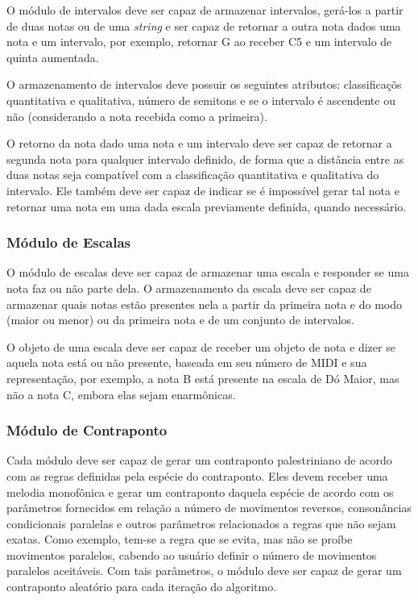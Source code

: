       O módulo de intervalos deve ser capaz de armazenar intervalos, gerá-los a partir de duas notas ou de uma \textit{string} e ser capaz de retornar a outra nota dados uma nota e um intervalo, por exemplo, retornar G ao receber C5 e um intervalo de quinta aumentada.

      O armazenamento de intervalos deve possuir os seguintes atributos: classificaçõs quantitativa e qualitativa, número de semitons e se o intervalo é ascendente ou não (considerando a nota recebida como a primeira).

      O retorno da nota dado uma nota e um intervalo deve ser capaz de retornar a segunda nota para qualquer intervalo definido, de forma que a distância entre as duas notas seja compatível com a classificação quantitativa e qualitativa do intervalo. Ele também deve ser capaz de indicar se é impossível gerar tal nota e retornar uma nota em uma dada escala previamente definida, quando necessário.

    \subsubsection[Módulo de Escalas]{Módulo de Escalas}

      O módulo de escalas deve ser capaz de armazenar uma escala e responder se uma nota faz ou não parte dela. O armazenamento da escala deve ser capaz de armazenar quais notas estão presentes nela a partir da primeira nota e do modo (maior ou menor) ou da primeira nota e de um conjunto de intervalos.

      O objeto de uma escala deve ser capaz de receber um objeto de nota e dizer se aquela nota está ou não presente, baseada em seu número de MIDI e sua representação, por exemplo, a nota B está presente na escala de Dó Maior, mas não a nota C\fl{}, embora elas sejam enarmônicas.

    \subsubsection[Módulos de Contraponto]{Módulo de Contraponto}

      Cada módulo deve ser capaz de gerar um contraponto palestriniano de acordo com as regras definidas pela espécie do contraponto. Eles devem receber uma melodia monofônica e gerar um contraponto daquela espécie de acordo com os parâmetros fornecidos em relação a número de movimentos reversos, consonâncias condicionais paralelas e outros parâmetros relacionados a regras que não sejam exatas. Como exemplo, tem-se a regra que se evita, mas não se proíbe movimentos paralelos, cabendo ao usuário definir o número de movimentos paralelos aceitáveis. Com tais parâmetros, o módulo deve ser capaz de gerar um contraponto aleatório para cada iteração do algoritmo.

